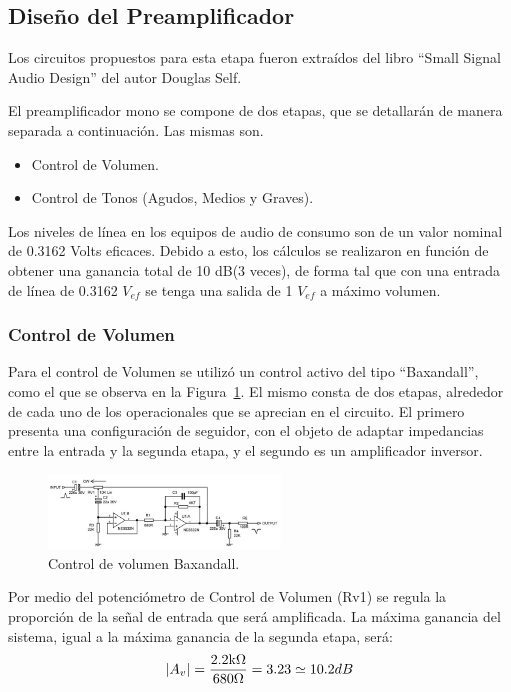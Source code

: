\subsection{Diseño del Preamplificador}

Los circuitos propuestos para esta etapa fueron extraídos del libro “Small Signal Audio Design” del autor Douglas Self.

El preamplificador mono se compone de dos etapas, que se detallarán de manera separada a continuación. Las mismas son.

\begin{itemize}
\item Control de Volumen.
\item Control de Tonos (Agudos, Medios y Graves).
\end{itemize}

Los niveles de línea en los equipos de audio de consumo son de un valor nominal de 0.3162 Volts eficaces. Debido a esto, los cálculos se realizaron en función de obtener una ganancia total de 10 dB(3 veces), de forma tal que con una entrada de línea de 0.3162 $V_{ef}$ se tenga una salida de 1 $V_{ef}$ a máximo volumen.

\subsubsection{Control de Volumen}

Para el control de Volumen se utilizó un control activo del tipo “Baxandall”, como el que se observa en la Figura~\ref{ctrl_vol}. El mismo consta de dos etapas, alrededor de cada uno de los operacionales que se aprecian en el circuito. El primero presenta una configuración de seguidor, con el objeto de adaptar impedancias entre la entrada y la segunda etapa, y el segundo es un amplificador inversor.


\begin{figure}[H]
\centering
\includegraphics[width=0.55\textwidth]{img/ctrl_vol.png}
\caption{Control de volumen Baxandall.}
\label{ctrl_vol} 
\end{figure}


Por medio del potenciómetro de Control de Volumen (Rv1) se regula la proporción de la señal de entrada que será amplificada.
La máxima ganancia del sistema, igual a la máxima ganancia de la segunda etapa, será: 
$$
\vert A_v \vert = \frac{2.2 \mbox{k}\Omega}{680 \Omega}=3.23\simeq10.2dB
$$

